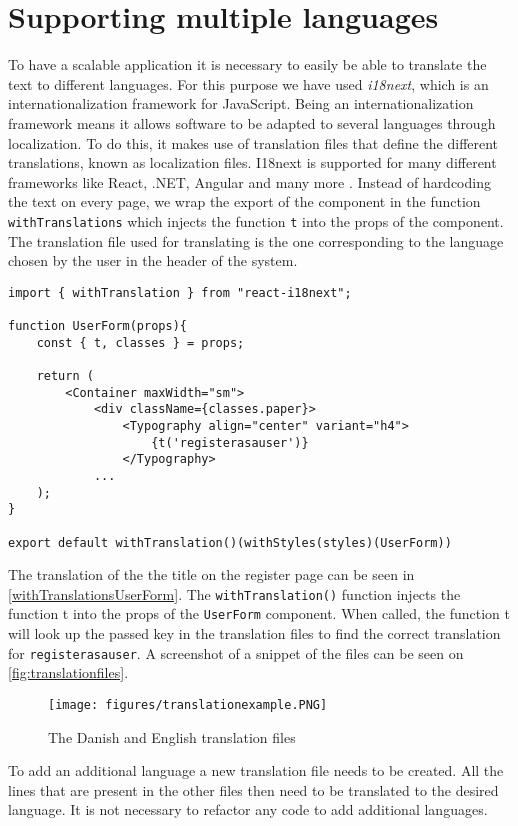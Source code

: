 \section{Supporting multiple languages}
To have a scalable application it is necessary to easily be able to translate the text to different languages.
For this purpose we have used \textit{i18next}, which is an internationalization framework for JavaScript.
Being an internationalization framework means it allows software to be adapted to several languages through localization.
To do this, it makes use of translation files that define the different translations, known as localization files.
I18next is supported for many different frameworks like React, .NET, Angular and many more \cite{i18next}.
Instead of hardcoding the text on every page, we wrap the export of the component in the function \texttt{withTranslations} which injects the function \texttt{t} into the props of the component.
The translation file used for translating is the one corresponding to the language chosen by the user in the header of the system.  

\begin{lstlisting}[caption={Translated header when registering as a user.}, captionpos=b, label={withTranslationsUserForm}]
import { withTranslation } from "react-i18next";

function UserForm(props){
    const { t, classes } = props;

    return (
        <Container maxWidth="sm">
            <div className={classes.paper}>
                <Typography align="center" variant="h4">
                    {t('registerasauser')}
                </Typography>
            ...
    );
}

export default withTranslation()(withStyles(styles)(UserForm))
\end{lstlisting}
\noindent
The translation of the the title on the register page can be seen in \autoref{withTranslationsUserForm}.
The \texttt{withTranslation()} function injects the function t into the props of the \texttt{UserForm} component.
When called, the function t will look up the passed key in the translation files to find the correct translation for \texttt{registerasauser}. 
A screenshot of a snippet of the files can be seen on \autoref{fig:translationfiles}.
\begin{figure}
    \centering
    \texttt{[image: figures/translationexample.PNG]}
    \caption{The Danish and English translation files}
    \label{fig:translationfiles}
\end{figure}
\noindent
To add an additional language a new translation file needs to be created.
All the lines that are present in the other files then need to be translated to the desired language. 
It is not necessary to refactor any code to add additional languages.
